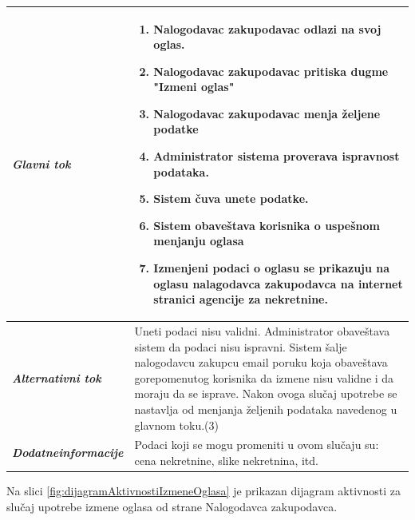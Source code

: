 \documentclass[20pt]{article}
\begin{document}
\begin{center}
\begin{longtable}{p{0.23\linewidth} p{0.77\linewidth}}
     {\it \bfseries Glavni tok} &  
     \begin{enumerate}
         \item Nalogodavac zakupodavac odlazi na svoj oglas.
         \item Nalogodavac zakupodavac pritiska dugme "Izmeni oglas"
         \item Nalogodavac zakupodavac menja \v {z}eljene podatke
         \item Administrator sistema proverava ispravnost podataka.
         \item Sistem \v {c}uva unete podatke.
         \item Sistem obave\v {s}tava korisnika o uspe\v {s}nom menjanju oglasa
         \item Izmenjeni podaci o oglasu se prikazuju na oglasu nalagodavca zakupodavca na internet stranici agencije za nekretnine.
    \end{enumerate}\\
 \hline
 {\it \bfseries Alternativni tok} & Uneti podaci nisu validni. Administrator obave\v {s}tava sistem da podaci nisu ispravni. Sistem \v {s}alje nalogodavcu zakupcu email poruku koja obave\v {s}tava gorepomenutog korisnika da izmene nisu validne i da moraju da se isprave. Nakon ovoga slu\v {c}aj upotrebe se nastavlja od menjanja \v {z}eljenih podataka navedenog u glavnom toku.(3)\\
 \hline
 {\it \bfseries Dodatne\newline informacije} & Podaci koji se mogu promeniti u ovom slu\v {c}aju su: cena nekretnine, slike nekretnina, itd.\\
 \hline

\end{longtable}
\end{center}
\newpage
Na slici \ref{fig:dijagramAktivnostiIzmeneOglasa} je prikazan dijagram aktivnosti za slu\v{c}aj upotrebe izmene oglasa od strane Nalogodavca zakupodavca.
\end{document}
